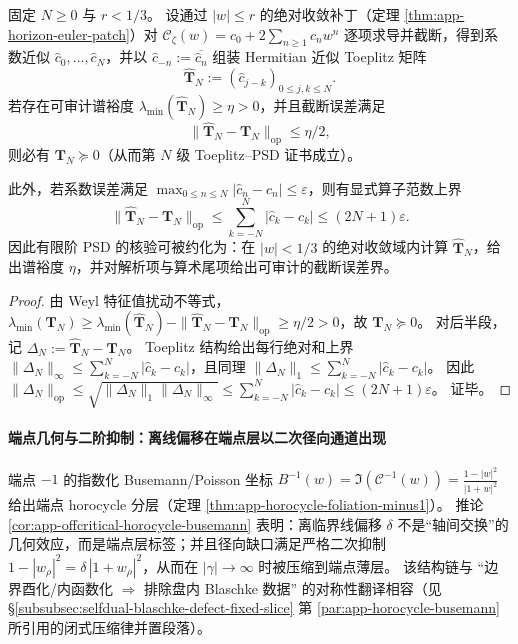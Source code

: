 \begin{theorem}\label{thm:xi-spectral-margin-finite-psd-certificate}
固定 \(N\ge 0\) 与 \(r<1/3\)。
设通过 \(|w|\le r\) 的绝对收敛补丁（定理 \ref{thm:app-horizon-euler-patch}）对 \(\mathscr{C}_{\zeta}(w)=c_0+2\sum_{n\ge 1}c_n w^n\) 逐项求导并截断，得到系数近似 \(\widehat c_0,\dots,\widehat c_N\)，并以 \(\widehat c_{-n}:=\overline{\widehat c_n}\) 组装 Hermitian 近似 Toeplitz 矩阵
\[
\widehat{\mathbf{T}}_N:=(\widehat c_{j-k})_{0\le j,k\le N}.
\]
若存在可审计谱裕度 \(\lambda_{\min}(\widehat{\mathbf{T}}_N)\ge \eta>0\)，并且截断误差满足
\[
\bigl\|\widehat{\mathbf{T}}_N-\mathbf{T}_N\bigr\|_{\mathrm{op}}\le \eta/2,
\]
则必有 \(\mathbf{T}_N\succeq 0\)（从而第 \(N\) 级 Toeplitz--PSD 证书成立）。
\par
此外，若系数误差满足 \(\max_{0\le n\le N}|\widehat c_n-c_n|\le \varepsilon\)，则有显式算子范数上界
\[
\bigl\|\widehat{\mathbf{T}}_N-\mathbf{T}_N\bigr\|_{\mathrm{op}}
\le \sum_{k=-N}^{N}|\widehat c_k-c_k|
\le (2N+1)\varepsilon.
\]
因此有限阶 PSD 的核验可被约化为：在 \(|w|<1/3\) 的绝对收敛域内计算 \(\widehat{\mathbf{T}}_N\)，给出谱裕度 \(\eta\)，并对解析项与算术尾项给出可审计的截断误差界。
\end{theorem}

\begin{proof}
由 Weyl 特征值扰动不等式，
\(
\lambda_{\min}(\mathbf{T}_N)\ge \lambda_{\min}(\widehat{\mathbf{T}}_N)-\|\widehat{\mathbf{T}}_N-\mathbf{T}_N\|_{\mathrm{op}}
\ge \eta/2>0
\)，故 \(\mathbf{T}_N\succeq 0\)。
对后半段，记 \(\Delta_N:=\widehat{\mathbf{T}}_N-\mathbf{T}_N\)。
Toeplitz 结构给出每行绝对和上界
\(
\|\Delta_N\|_{\infty}\le \sum_{k=-N}^{N}|\widehat c_k-c_k|
\)，且同理 \(\|\Delta_N\|_{1}\le \sum_{k=-N}^{N}|\widehat c_k-c_k|\)。
因此
\(
\|\Delta_N\|_{\mathrm{op}}\le \sqrt{\|\Delta_N\|_1\|\Delta_N\|_\infty}\le \sum_{k=-N}^{N}|\widehat c_k-c_k|
\le (2N+1)\varepsilon
\)。
证毕。
\end{proof}

\paragraph{端点几何与二阶抑制：离线偏移在端点层以二次径向通道出现}
端点 \(-1\) 的指数化 Busemann/Poisson 坐标
\(B^{-1}(w)=\Im(\mathcal{C}^{-1}(w))=\frac{1-|w|^2}{|1+w|^2}\)
给出端点 horocycle 分层（定理 \ref{thm:app-horocycle-foliation-minus1}）。
推论 \ref{cor:app-offcritical-horocycle-busemann} 表明：离临界线偏移 \(\delta\) 不是“轴间交换”的几何效应，而是端点层标签；并且径向缺口满足严格二次抑制
\(1-|w_\rho|^2=\delta\,|1+w_\rho|^2\)，从而在 \(|\gamma|\to\infty\) 时被压缩到端点薄层。
该结构链与 “边界酉化/内函数化 \(\Rightarrow\) 排除盘内 Blaschke 数据” 的对称性翻译相容（见 \S\ref{subsubsec:selfdual-blaschke-defect-fixed-slice} 第 \ref{par:app-horocycle-busemann} 所引用的闭式压缩律并置段落）。

